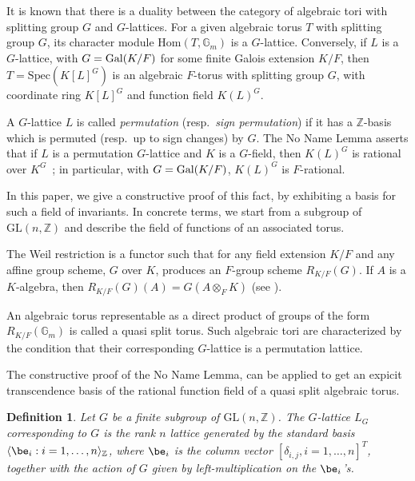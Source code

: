 \documentclass[12pt]{article}
\theoremstyle{plain}
\newtheorem{definition}[theorem]{Definition}
\newcommand{\Z}{\ensuremath{\mathbb{Z}}}
\begin{document}
It is known that there is a duality between the category of algebraic
tori with splitting group $G$ and $G$-lattices. For a given algebraic
torus $T$ with splitting group $G$, its character module
$\mathrm{Hom}(T,\mathbb{G}_m)$ is a $G$-lattice. Conversely, if $L$ is
a $G$-lattice, with $G={\rm Gal}(K/F)$ for some finite Galois
extension $K/F$, then $T=\mathrm{Spec}(K[L]^G)$ is an algebraic
$F$-torus with splitting group $G$, with coordinate ring $K[L]^G$ and
function field $K(L)^G$.

A $G$-lattice $L$ is called {\em permutation} (resp.\ {\em sign
  permutation}) if it has a $\Z$-basis which is permuted (resp.\ up to
sign changes) by $G$. The No Name Lemma asserts that if $L$ is a
permutation $G$-lattice and $K$ is a $G$-field, then $K(L)^G$ is
rational over $K^G$~\cite[Chapter~9.4]{Lorenz}; in particular, with
$G={\rm Gal}(K/F)$, $K(L)^G$ is $F$-rational.

In this paper, we give a constructive proof of this fact, by
exhibiting a basis for such a field of invariants.  In concrete terms,
we start from a subgroup of $\mathrm{GL}(n,\Z)$ and describe the field
of functions of an associated torus.

The Weil restriction is a functor such that for any field extension $K/F$ 
and any affine group scheme, $G$ over $K$, produces an $F$-group scheme 
$R_{K/F}(G)$. If $A $ is a $K$-algebra, then $R_{K/F}(G)(A) = G(A \otimes_F K)$
 (see \cite[Section 1.3.12]{Voskresenskii}).

An algebraic torus representable as a direct product of groups of the form 
$R_{K/F}(\mathbb{G}_m)$ is called a quasi split torus. Such algebraic tori 
are characterized by the condition that their corresponding $G$-lattice is 
a permutation lattice.

The constructive proof of the No Name Lemma, can be applied to get an expicit 
transcendence basis of the rational function field of a quasi split algebraic torus.

\begin{definition}\label{Assumption}
  Let $G$ be a finite subgroup of $\mathrm{GL}(n,\Z)$.  The
  $G$-lattice $L_G$ corresponding to $G$ is the rank $n$ lattice
  generated by the standard basis $\langle \be_i : i = 1,
  \ldots, n \rangle_\Z$, where $\be_i$ is the column vector
  $[\delta_{i,j}, i=1,\dots,n]^T$, together with the action of $G$ given
  by left-multiplication on the $\be_i$'s.
\end{definition}
\end{document}

